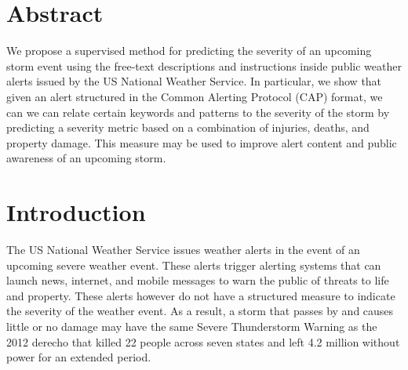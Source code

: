 \documentclass{article}
\begin{document}
 


\section{Abstract}
\label{abstract}

We propose a supervised method for predicting the severity of an upcoming storm event using the free-text descriptions and instructions inside public weather alerts issued by the US National Weather Service. In particular, we show that given an alert structured in the Common Alerting Protocol (CAP) format, we can we can relate certain keywords and patterns to the severity of the storm by predicting a severity metric based on a combination of injuries, deaths, and property damage. This measure may be used to improve alert content and public awareness of an upcoming storm.

\section{Introduction}
\label{introduction}
The US National Weather Service issues weather alerts in the event of an upcoming severe weather event. These alerts trigger alerting systems that can launch news, internet, and mobile messages to warn the public of threats to life and property. These alerts however do not have a structured measure to indicate the severity of the weather event. As a result, a storm that passes by and causes little or no damage may have the same Severe Thunderstorm Warning as the 2012 derecho that killed 22 people across seven states and left 4.2 million without power for an extended period.
\end{document}
